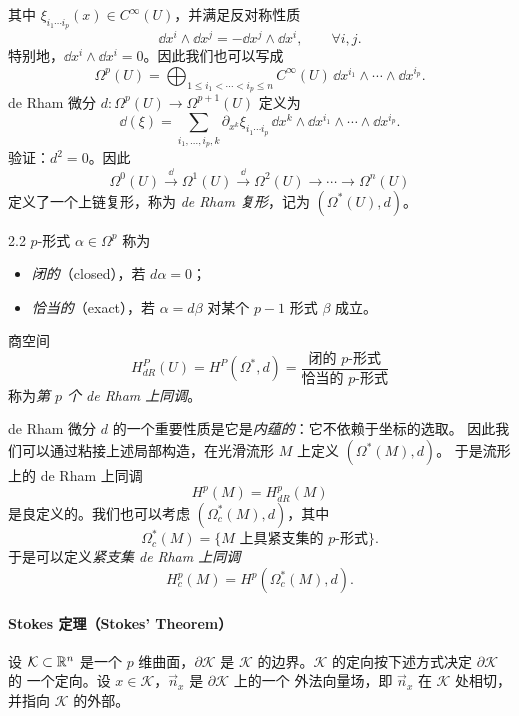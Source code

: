 其中 $\xi_{i_{1}\cdots i_{p}}(x)\in C^{\infty}(U)$，并满足反对称性质
\[
  \dd x^{i}\wedge\dd x^{j}=-\dd x^{j}\wedge\dd x^{i},\qquad \forall i,j.
\]
特别地，$\dd x^{i}\wedge\dd x^{i}=0$。因此我们也可以写成
\[
  \Omega^{p}(U)=\bigoplus_{1\le i_{1}<\cdots<i_{p}\le n}
  C^{\infty}(U)\,\dd x^{i_{1}}\wedge\cdots\wedge\dd x^{i_{p}}.
\]
de Rham 微分 $d:\Omega^{p}(U)\to\Omega^{p+1}(U)$ 定义为
\[
  \dd(\xi)=\sum_{i_{1},\ldots,i_{p},k}
  \partial_{x^{k}}\xi_{i_{1}\cdots i_{p}}\,
  \dd x^{k}\wedge\dd x^{i_{1}}\wedge\cdots\wedge\dd x^{i_{p}}.
\]
验证：$d^{2}=0$。因此
\[
  \Omega^{0}(U)\xrightarrow{\ \dd\ }\Omega^{1}(U)\xrightarrow{\ \dd\ }
  \Omega^{2}(U)\to\cdots\to\Omega^{n}(U)
\]
定义了一个上链复形，称为 \emph{de Rham 复形}，记为 $(\Omega^{*}(U),d)$。


\begin{wdefn}{2.2}
  $p$-形式 $\alpha\in\Omega^{p}$ 称为
  \begin{itemize}[leftmargin=1.6em,itemsep=0.12em,topsep=0.2em]
    \item \emph{闭的}（closed），若 $d\alpha=0$；
    \item \emph{恰当的}（exact），若 $\alpha=d\beta$ 对某个 $p-1$ 形式 $\beta$ 成立。
  \end{itemize}
  商空间
  \[
    H^{P}_{dR}(U)=H^{P}(\Omega^{*},d)
    =\frac{\text{闭的 }p\text{-形式}}{\text{恰当的 }p\text{-形式}}
  \]
  称为\emph{第 $p$ 个 de Rham 上同调}。
\end{wdefn}

de Rham 微分 $d$ 的一个重要性质是它是\emph{内蕴的}：它不依赖于坐标的选取。
因此我们可以通过粘接上述局部构造，在光滑流形 $M$ 上定义 $(\Omega^{*}(M),d)$。
于是流形上的 de Rham 上同调
\[
  H^{p}(M)=H^{p}_{dR}(M)
\]
是良定义的。我们也可以考虑 $(\Omega^{*}_{c}(M),d)$，其中
\[
  \Omega^{*}_{c}(M)=\{\text{$M$ 上具紧支集的 }p\text{-形式}\}.
\]
于是可以定义\emph{紧支集 de Rham 上同调}
\[
  H^{p}_{c}(M)=H^{p}(\Omega^{*}_{c}(M),d).
\]

\paragraph{Stokes 定理（Stokes' Theorem）}

设 $\mathcal{K}\subset\mathbb{R}^{n}$ 是一个 $p$ 维曲面，$\partial\mathcal{K}$ 是
$\mathcal{K}$ 的边界。$\mathcal{K}$ 的定向按下述方式决定 $\partial\mathcal{K}$ 的
一个定向。设 $x\in\mathcal{K}$，$\vec{n}_{x}$ 是 $\partial\mathcal{K}$ 上的一个
外法向量场，即 $\vec{n}_{x}$ 在 $\mathcal{K}$ 处相切，并指向 $\mathcal{K}$ 的外部。

